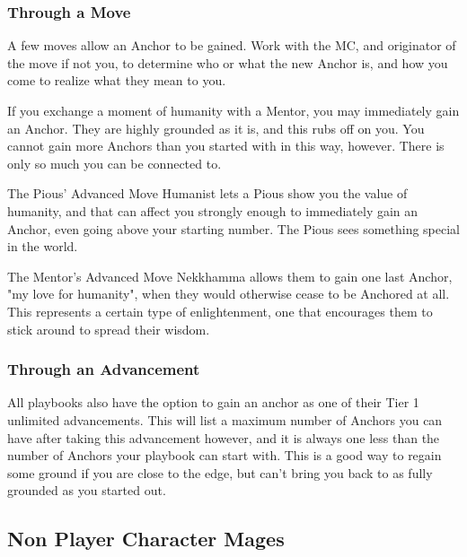 \documentclass[
  oneside,
  statementpaper,
  9pt]{memoir}
\begin{document}
\hypertarget{through-a-move}{%
\subsubsection{Through a Move}\label{through-a-move}}

\begin{Player}

A few moves allow an Anchor to be gained. Work with the MC, and originator of the move if not you, to determine who or what the new Anchor is, and how you come to realize what they mean to you.

If you exchange a moment of humanity with a Mentor, you may immediately gain an Anchor. They are highly grounded as it is, and this rubs off on you. You cannot gain more Anchors than you started with in this way, however. There is only so much you can be connected to.

The Pious’ Advanced Move Humanist lets a Pious show you the value of humanity, and that can affect you strongly enough to immediately gain an Anchor, even going above your starting number. The Pious sees something special in the world.

The Mentor’s Advanced Move Nekkhamma allows them to gain one last Anchor, "my love for humanity", when they would otherwise cease to be Anchored at all. This represents a certain type of enlightenment, one that encourages them to stick around to spread their wisdom.

\end{Player}

\hypertarget{through-an-advancement}{%
\subsubsection{Through an Advancement}\label{through-an-advancement}}

\begin{Player}

All playbooks also have the option to gain an anchor as one of their Tier 1 unlimited advancements. This will list a maximum number of Anchors you can have after taking this advancement however, and it is always one less than the number of Anchors your playbook can start with. This is a good way to regain some ground if you are close to the edge, but can’t bring you back to as fully grounded as you started out.

\end{Player}

\hypertarget{non-player-character-mages}{%
\subsection{Non Player Character
Mages}\label{non-player-character-mages}}
\end{document}
